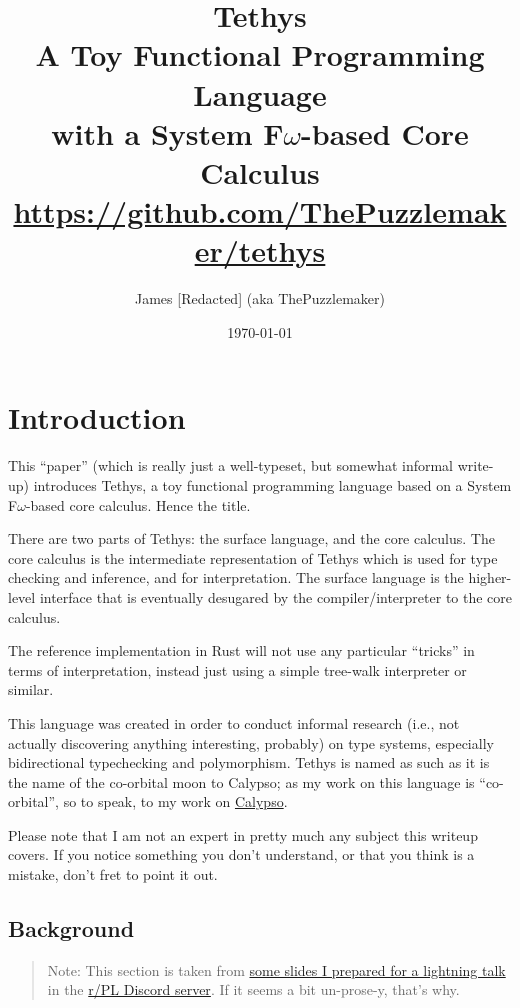 \documentclass[11pt]{article}
\title{Tethys\\
    \large A Toy Functional Programming Language\\
    with a System F$\omega$-based Core Calculus\\
    \url{https://github.com/ThePuzzlemaker/tethys}}
\author{James [Redacted] (aka ThePuzzlemaker)}
\date{\today}
\begin{document}
\maketitle

\tableofcontents
\newpage

\section{Introduction}

This ``paper'' (which is really just a well-typeset, but somewhat informal
    write-up) introduces Tethys, a toy functional programming language based on
    a System F$\omega$-based core calculus. Hence the title.

There are two parts of Tethys: the surface language, and the core calculus. The
    core calculus is the intermediate representation of Tethys which is used
    for type checking and inference, and for interpretation. The surface
    language is the higher-level interface that is eventually desugared by the
    compiler/interpreter to the core calculus.

The reference implementation in Rust will not use any particular ``tricks'' in
    terms of interpretation, instead just using a simple tree-walk interpreter
    or similar.

This language was created in order to conduct informal research (i.e., not
    actually discovering anything interesting, probably) on type systems,
    especially bidirectional typechecking and polymorphism. Tethys is named as
    such as it is the name of the co-orbital moon to Calypso; as my work on
    this language is ``co-orbital'', so to speak, to my work on
    \href{https://calypso-lang.github.io}{Calypso}.

Please note that I am not an expert in pretty much any subject this writeup
    covers. If you notice something you don't understand, or that you think is
    a mistake, don't fret to point it out.

\subsection{Background}

\begin{quote}
    Note: This section is taken from
        \href{https://thepuzzlemaker.info/static/tethys-slides/}{some slides I
        prepared for a lightning talk} in the
        \href{https://discord.gg/26X6ChQQcG}{r/PL Discord server}. If it seems
        a bit un-prose-y, that's why.
\end{quote}
\end{document}
